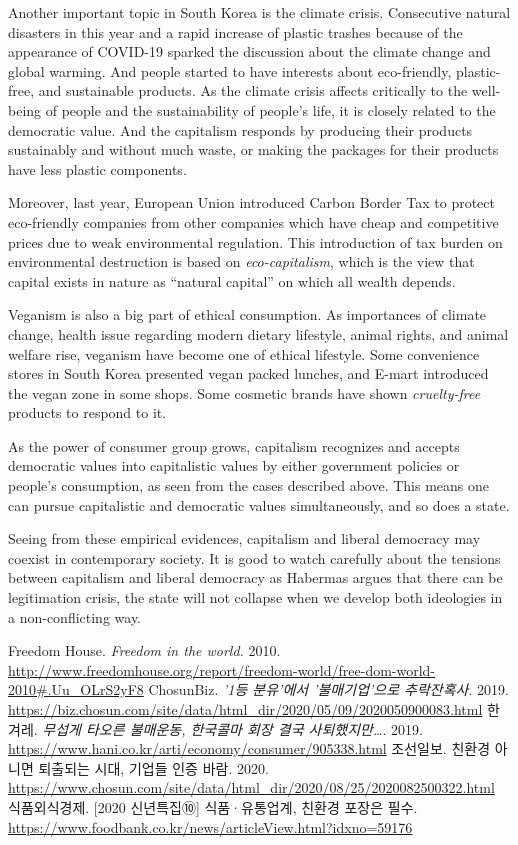 \documentclass{homework}
\begin{document}
Another important topic in South Korea is the climate crisis. Consecutive natural disasters in this year and a rapid increase of plastic trashes because of the appearance of COVID-19 sparked the discussion about the climate change and global warming. And people started to have interests about eco-friendly, plastic-free, and sustainable products. As the climate crisis affects critically to the well-being of people and the sustainability of people's life, it is closely related to the democratic value. And the capitalism responds by producing their products sustainably and without much waste, or making the packages for their products have less plastic components. \cite{Eco,Eco2}

Moreover, last year, European Union introduced Carbon Border Tax to protect eco-friendly companies from other companies which have cheap and competitive prices due to weak environmental regulation. This introduction of tax burden on environmental destruction is based on \textit{eco-capitalism}, which is the view that capital exists in nature as ``natural capital'' on which all wealth depends.

Veganism is also a big part of ethical consumption. As importances of climate change, health issue regarding modern dietary lifestyle, animal rights, and animal welfare rise, veganism have become one of ethical lifestyle. Some convenience stores in South Korea presented vegan packed lunches, and E-mart introduced the vegan zone in some shops. Some cosmetic brands have shown \textit{cruelty-free} products to respond to it.

As the power of consumer group grows, capitalism recognizes and accepts democratic values into capitalistic values by either government policies or people's consumption, as seen from the cases described above. This means one can pursue capitalistic and democratic values simultaneously, and so does a state.

Seeing from these empirical evidences, capitalism and liberal democracy may coexist in contemporary society. It is good to watch carefully about the tensions between capitalism and liberal democracy as Habermas argues that there can be legitimation crisis, the state will not collapse when we develop both ideologies in a non-conflicting way.



\begin{thebibliography}{9}
  Freedom House. \textit{Freedom in the world.} 2010. \url{http://www.freedomhouse.org/report/freedom-world/free-dom-world-2010#.Uu_OLrS2yF8}
   ChosunBiz. \textit{'1등 분유'에서 '불매기업'으로 추락 잔혹사}. 2019. \url{https://biz.chosun.com/site/data/html_dir/2020/05/09/2020050900083.html}
   한겨레. \textit{무섭게 타오른 불매운동, 한국콜마 회장 결국 사퇴했지만\dots}. 2019. \url{https://www.hani.co.kr/arti/economy/consumer/905338.html}
   조선일보. 친환경 아니면 퇴출되는 시대, 기업들 인증 바람. 2020. \url{https://www.chosun.com/site/data/html_dir/2020/08/25/2020082500322.html}
   식품외식경제. [2020 신년특집⑩] 식품·유통업계, 친환경 포장은 필수. \url{https://www.foodbank.co.kr/news/articleView.html?idxno=59176}
\end{thebibliography}
\end{document}
